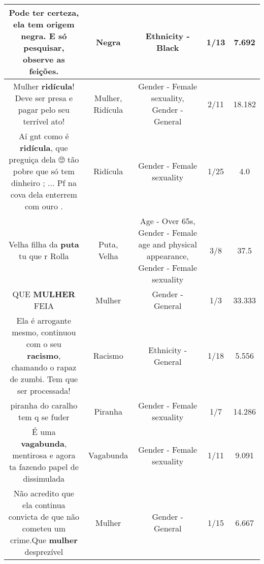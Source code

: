 \documentclass[11pt]{article}
\newlength\mylength
\begin{document}
\begin{center}
\begin{longtable}{|C{.65\mylength}|C{.30\mylength}|C{.12\mylength}|C{.12\mylength}|C{.12\mylength}|}
  \small Pode ter certeza, ela tem origem \textbf{negra}. E só pesquisar, observe as feições.\normalsize   & Negra & Ethnicity - Black & 1/13 & 7.692 \\  \hline
  \small Mulher \textbf{ridícula}! Deve ser presa e pagar pelo seu terrível ato!\normalsize   & Mulher, Ridícula & Gender - Female sexuality, Gender - General & 2/11 & 18.182 \\  \hline
  \small Aí gnt como é \textbf{ridícula}, que preguiça dela 🙄 tão pobre que só tem dinheiro ; ... Pf na cova dela enterrem com ouro .\normalsize   & Ridícula & Gender - Female sexuality & 1/25 & 4.0 \\  \hline
  \small Velha filha da \textbf{puta} tu que r Rolla\normalsize   & Puta, Velha & Age - Over 65s, Gender - Female age and physical appearance, Gender - Female sexuality & 3/8 & 37.5 \\  \hline
  \small QUE \textbf{MULHER} FEIA\normalsize   & Mulher & Gender - General & 1/3 & 33.333 \\  \hline
  \small Ela é arrogante mesmo, continuou com o seu \textbf{racismo}, chamando o rapaz de zumbi. Tem que ser processada!\normalsize   & Racismo & Ethnicity - General & 1/18 & 5.556 \\  \hline
  \small piranha do caralho tem q se fuder\normalsize   & Piranha & Gender - Female sexuality & 1/7 & 14.286 \\  \hline
  \small É uma \textbf{vagabunda}, mentirosa e agora ta fazendo papel de dissimulada\normalsize   & Vagabunda & Gender - Female sexuality & 1/11 & 9.091 \\  \hline
  \small Não acredito que ela continua convicta de que não cometeu um crime.Que \textbf{mulher} desprezível\normalsize   & Mulher & Gender - General & 1/15 & 6.667 \\  \hline

\end{longtable}
\end{center}
\end{document}
